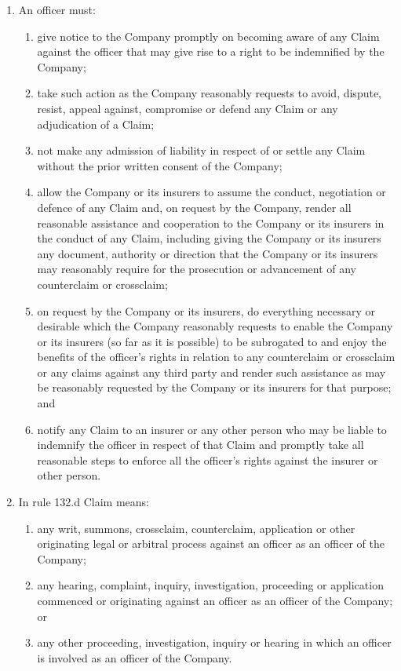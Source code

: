 \begin{enumerate}[label=(\alph*)]
    \item An officer must:
    \begin{enumerate}[label=(\roman*)]
        \item give notice to the Company promptly on becoming aware of any Claim against the officer that may give rise to a right to be indemnified by the Company;
        \item take such action as the Company reasonably requests to avoid, dispute, resist, appeal against, compromise or defend any Claim or any adjudication of a Claim;
        \item not make any admission of liability in respect of or settle any Claim without the prior written consent of the Company;
        \item allow the Company or its insurers to assume the conduct, negotiation or defence of any Claim and, on request by the Company, render all reasonable assistance and cooperation to the Company or its insurers in the conduct of any Claim, including giving the Company or its insurers any document, authority or direction that the Company or its insurers may reasonably require for the prosecution or advancement of any counterclaim or crossclaim;
        \item on request by the Company or its insurers, do everything necessary or desirable which the Company reasonably requests to enable the Company or its insurers (so far as it is possible) to be subrogated to and enjoy the benefits of the officer's rights in relation to any counterclaim or crossclaim or any claims against any third party and render such assistance as may be reasonably requested by the Company or its insurers for that purpose; and
        \item notify any Claim to an insurer or any other person who may be liable to indemnify the officer in respect of that Claim and promptly take all reasonable steps to enforce all the officer's rights against the insurer or other person.
    \end{enumerate}
    
    \item In rule 132.d Claim means:
    \begin{enumerate}[label=(\roman*)]
        \item any writ, summons, crossclaim, counterclaim, application or other originating legal or arbitral process against an officer as an officer of the Company;
        \item any hearing, complaint, inquiry, investigation, proceeding or application commenced or originating against an officer as an officer of the Company; or
        \item any other proceeding, investigation, inquiry or hearing in which an officer is involved as an officer of the Company.
    \end{enumerate}
\end{enumerate} 